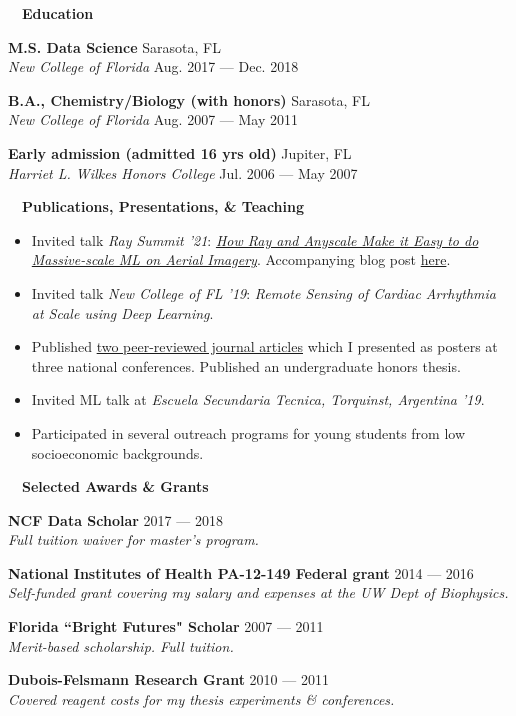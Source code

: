 \documentclass[a4paper,12pt]{article}
\newcommand{\resheading}[1]{{\hspace{-9pt} \colorbox{mygrey}{\begin{minipage}{\textwidth}{\textmd{~~\large \textbf{#1} \vphantom{p\^{E}}}}\end{minipage}}\vspace{6pt}} }
\newcommand{\ressubheading}[4]{{\begin{minipage}{\textwidth}
                                    \textbf{#1} \hfill #2 \\
                                    \textit{#3} \hfill #4 \\
\end{minipage}}}
\begin{document}
    \resheading{Education}

    \ressubheading{M.S. Data Science}{Sarasota, FL}{New College of Florida}{Aug. 2017 --- Dec. 2018}



    \ressubheading{B.A., Chemistry/Biology (with honors)}{Sarasota, FL}{New College of Florida}{Aug. 2007 --- May 2011}

    \ressubheading{Early admission (admitted 16 yrs old)}{Jupiter, FL}{Harriet L. Wilkes Honors College}{Jul. 2006 --- May 2007}

    \resheading{Publications, Presentations, \& Teaching}
    \vspace{-19pt} \begin{itemize}
                       \item Invited talk \textit{Ray Summit '21}: \href{https://www.anyscale.com/events/2021/06/22/how-ray-and-anyscale-make-it-easy-to-do-massive-scale-ml-on-aerial-imagery}{\textit{How Ray and Anyscale Make it Easy to do Massive-scale ML on Aerial Imagery}}. Accompanying blog post \href{https://www.anyscale.com/blog/how-ray-and-anyscale-make-it-easy-to-do-massive-scale-machine-learning-on}{here}.
                       \item Invited talk \textit{New College of FL '19}: \textit{Remote Sensing of Cardiac Arrhythmia at Scale using Deep Learning}.
                       \item Published \href{https://scholar.google.co.nz/citations?user=4ODJ78oAAAAJ&hl=en}{two peer-reviewed journal articles} which I presented as posters at three national conferences.
                       Published an undergraduate honors thesis.
                       \item Invited ML talk at \textit{Escuela Secundaria Tecnica, Torquinst, Argentina '19}.
                       \item Participated in several outreach programs for young students from low socioeconomic backgrounds.
    \end{itemize}


    \resheading{Selected Awards \& Grants}
    \ressubheading{NCF Data Scholar}{2017 --- 2018}{Full tuition waiver for master's program.}{}

    \ressubheading{National Institutes of Health PA-12-149 Federal grant}{2014 --- 2016}{Self-funded grant covering my salary and expenses at the UW Dept of Biophysics.}{}


    \ressubheading{Florida ``Bright Futures" Scholar}{2007 --- 2011}{Merit-based scholarship. Full tuition.}{}

    \ressubheading{Dubois-Felsmann Research Grant}{2010 --- 2011}{Covered reagent costs for my thesis experiments \& conferences.}{}
\end{document}
